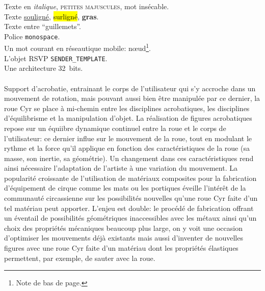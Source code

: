 
\label{sec:Introduction}  %
Texte en \emph{italique}, \textsc{petites majuscules}, mot \mbox{insécable}.\\
Texte \ul{souligné}, \hl{surligné}, \textbf{gras}.\\
Texte entre ``guillemets''.\\
Police \texttt{monospace}.\\
Un mot courant en réseautique mobile: n\oe{}ud\footnote{Note de bas de page.}.\\
L'objet RSVP \texttt{SENDER\_TEMPLATE}.\\
Une architecture 32~bits.\\
\\
Support d'acrobatie, entrainant le corps de l'utilisateur qui s'y accroche dans un mouvement de rotation, mais pouvant aussi bien être manipulée par ce dernier, la roue Cyr se place à mi-chemin entre les disciplines acrobatiques, les disciplines d'équilibrisme et la manipulation d'objet. La réalisation de figures acrobatiques repose sur un équiibre dynamique continuel entre la roue et le corps de l'utilisateur: ce dernier influe sur le mouvement de la roue, tout en modulant le rythme et la force qu'il applique en fonction des caractéristiques de la roue (sa masse, son inertie, sa géométrie). Un changement dans ces caractéristiques rend ainsi nécessaire l'adaptation de l'artiste à une variation du mouvement. La popularité croissante de l'utilisation de matériaux composites pour la fabrication d'équipement de cirque comme les mats ou les portiques éveille l'intérêt de la communauté circassienne sur les possibilités nouvelles qu'une roue Cyr faite d'un tel matériau peut apporter. L'enjeu est double: le procédé de fabrication offrant un éventail de possibilités géométriques inaccessibles avec les métaux ainsi qu'un choix des propriétés mécaniques beaucoup plus large, on y voit une occasion d'optimiser les mouvements déjà existants mais aussi d'inventer de nouvelles figures avec une roue Cyr faite d'un matériau dont les propriétés élastiques permettent, par exemple, de sauter avec la roue.
